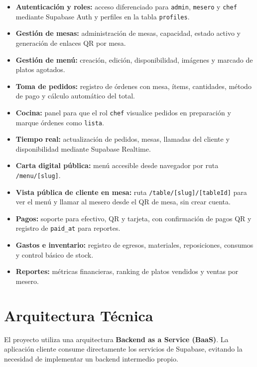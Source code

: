 \begin{itemize}[leftmargin=1.5em]
  \item \textbf{Autenticación y roles:} acceso diferenciado para \texttt{admin},
        \texttt{mesero} y \texttt{chef} mediante Supabase Auth y perfiles en la
        tabla \texttt{profiles}.
  \item \textbf{Gestión de mesas:} administración de mesas, capacidad, estado
        activo y generación de enlaces QR por mesa.
  \item \textbf{Gestión de menú:} creación, edición, disponibilidad, imágenes y
        marcado de platos agotados.
  \item \textbf{Toma de pedidos:} registro de órdenes con mesa, ítems, cantidades,
        método de pago y cálculo automático del total.
  \item \textbf{Cocina:} panel para que el rol \texttt{chef} visualice pedidos en
        preparación y marque órdenes como \texttt{lista}.
  \item \textbf{Tiempo real:} actualización de pedidos, mesas, llamadas del cliente
        y disponibilidad mediante Supabase Realtime.
  \item \textbf{Carta digital pública:} menú accesible desde navegador por ruta
        \texttt{/menu/[slug]}.
  \item \textbf{Vista pública de cliente en mesa:} ruta \texttt{/table/[slug]/[tableId]}
        para ver el menú y llamar al mesero desde el QR de mesa, sin crear cuenta.
  \item \textbf{Pagos:} soporte para efectivo, QR y tarjeta, con confirmación de
        pagos QR y registro de \texttt{paid\_at} para reportes.
  \item \textbf{Gastos e inventario:} registro de egresos, materiales, reposiciones,
        consumos y control básico de stock.
  \item \textbf{Reportes:} métricas financieras, ranking de platos vendidos y ventas
        por mesero.
\end{itemize}

\section{Arquitectura Técnica}

El proyecto utiliza una arquitectura \textbf{Backend as a Service (BaaS)}. La
aplicación cliente consume directamente los servicios de Supabase, evitando la
necesidad de implementar un backend intermedio propio.

